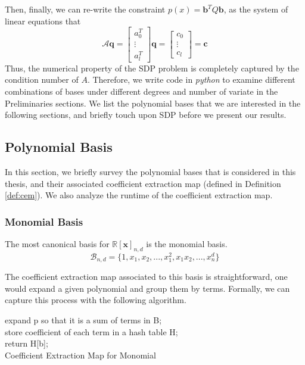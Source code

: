 \documentclass[12pt]{amsart}
\numberwithin{equation}{section}
\theoremstyle{definition}
\numberwithin{thm}{section}
\begin{document}
\smallskip
Then, finally, we can re-write the constraint $p(x) = \mathbf{b}^T Q \mathbf{b}$, as the system of linear equations that 
\begin{equation*}
     \mathcal{A} \mathbf{q} = \begin{bmatrix}
          a_0^T \\
          \vdots \\
          a_l^T
     \end{bmatrix} \mathbf{q} = \begin{bmatrix}
          c_0 \\
          \vdots \\
          c_l
     \end{bmatrix} = \mathbf{c}
\end{equation*}
Thus, the numerical property of the SDP problem is completely captured by the condition number of $A$. 
Therefore, we write code in \emph{python} to examine different combinations of bases under different degrees and number of variate in the Preliminaries sections. 
We list the polynomial bases that we are interested in the following sections, and briefly touch upon SDP before we present our results.

\subsection{Polynomial Basis}
\label{Sec:polynomial Basis}
In this section, we briefly survey the polynomial bases that is considered in this thesis,
and their associated {coefficient extraction map} (defined in Definition \ref{def:cem}).
We also analyze the runtime of the {coefficient extraction map}.

\subsubsection{Monomial Basis}
The most canonical basis for $\mathbb{R}[\mathbf{x}]_{n, d}$ is the monomial basis. 
\begin{equation*}
     \mathcal{B}_{n, d} = \{1, x_1, x_2, ..., x_1^2, x_1 x_2, ..., x_n^d\}
\end{equation*}

The {coefficient extraction map} associated to this basis is straightforward, 
one would expand a given polynomial and group them by terms. Formally, we can capture this process with the following algorithm.

\begin{algorithm}[H]
     \SetAlgoLined
     expand p so that it is a sum of terms in B;\\
     store coefficient of each term in a hash table H;\\
     return H[b];\\
     \caption{Coefficient Extraction Map for Monomial}
\end{algorithm}
\end{document}
